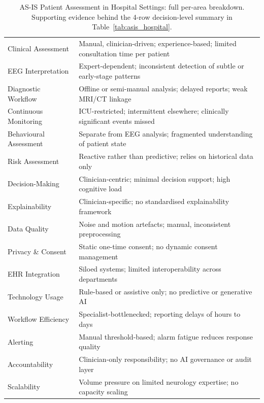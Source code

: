 {
\begin{xltabular}{\textwidth}{@{} >{\raggedright\arraybackslash}p{3.8cm} L @{}}
\caption[AS-IS Hospital Assessment: Full Per-Area Breakdown]{AS-IS Patient Assessment in Hospital Settings: full per-area breakdown. Supporting evidence behind the 4-row decision-level summary in Table~\ref{tab:asis_hospital}.}\label{tab:appa_asis_hospital_full} \\
\toprule
{} &  \\
\midrule
\endfirsthead
\endhead
\bottomrule
\endlastfoot
Clinical Assessment & Manual, clinician-driven; experience-based; limited consultation time per patient \\
\addlinespace
EEG Interpretation & Expert-dependent; inconsistent detection of subtle or early-stage patterns \\
\addlinespace
Diagnostic Workflow & Offline or semi-manual analysis; delayed reports; weak MRI/CT linkage \\
\addlinespace
Continuous Monitoring & ICU-restricted; intermittent elsewhere; clinically significant events missed \\
\addlinespace
Behavioural Assessment & Separate from EEG analysis; fragmented understanding of patient state \\
\addlinespace
Risk Assessment & Reactive rather than predictive; relies on historical data only \\
\addlinespace
Decision-Making & Clinician-centric; minimal decision support; high cognitive load \\
\addlinespace
Explainability & Clinician-specific; no standardised explainability framework \\
\addlinespace
Data Quality & Noise and motion artefacts; manual, inconsistent preprocessing \\
\addlinespace
Privacy \& Consent & Static one-time consent; no dynamic consent management \\
\addlinespace
EHR Integration & Siloed systems; limited interoperability across departments \\
\addlinespace
Technology Usage & Rule-based or assistive only; no predictive or generative AI \\
\addlinespace
Workflow Efficiency & Specialist-bottlenecked; reporting delays of hours to days \\
\addlinespace
Alerting & Manual threshold-based; alarm fatigue reduces response quality \\
\addlinespace
Accountability & Clinician-only responsibility; no AI governance or audit layer \\
\addlinespace
Scalability & Volume pressure on limited neurology expertise; no capacity scaling \\
\end{xltabular}}
